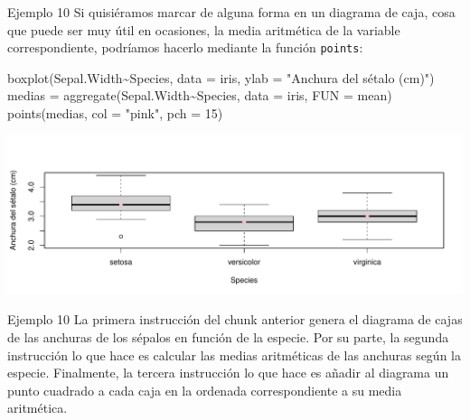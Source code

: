 \documentclass[
  ignorenonframetext,
  aspectratio=169]{beamer}
\newenvironment{Shaded}{\begin{snugshade}}{\end{snugshade}}
\newcommand{\AttributeTok}[1]{\textcolor[rgb]{0.77,0.63,0.00}{#1}}
\newcommand{\DecValTok}[1]{\textcolor[rgb]{0.00,0.00,0.81}{#1}}
\newcommand{\FunctionTok}[1]{\textcolor[rgb]{0.00,0.00,0.00}{#1}}
\newcommand{\NormalTok}[1]{#1}
\newcommand{\OtherTok}[1]{\textcolor[rgb]{0.56,0.35,0.01}{#1}}
\newcommand{\SpecialCharTok}[1]{\textcolor[rgb]{0.00,0.00,0.00}{#1}}
\newcommand{\StringTok}[1]{\textcolor[rgb]{0.31,0.60,0.02}{#1}}
\begin{document}
\begin{frame}[fragile]{Ejemplo 10}
\protect\hypertarget{ejemplo-10-1}{}
Si quisiéramos marcar de alguna forma en un diagrama de caja, cosa que
puede ser muy útil en ocasiones, la media aritmética de la variable
correspondiente, podríamos hacerlo mediante la función \texttt{points}:

\begin{Shaded}
\begin{Highlighting}[]
\FunctionTok{boxplot}\NormalTok{(Sepal.Width}\SpecialCharTok{\textasciitilde{}}\NormalTok{Species, }\AttributeTok{data =}\NormalTok{ iris, }\AttributeTok{ylab =} \StringTok{"Anchura del sétalo (cm)"}\NormalTok{)}
\NormalTok{medias }\OtherTok{=} \FunctionTok{aggregate}\NormalTok{(Sepal.Width}\SpecialCharTok{\textasciitilde{}}\NormalTok{Species, }\AttributeTok{data =}\NormalTok{ iris, }\AttributeTok{FUN =}\NormalTok{ mean)}
\FunctionTok{points}\NormalTok{(medias, }\AttributeTok{col =} \StringTok{"pink"}\NormalTok{, }\AttributeTok{pch =} \DecValTok{15}\NormalTok{)}
\end{Highlighting}
\end{Shaded}

\includegraphics[width=0.8\linewidth]{Hora5_files/figure-beamer/unnamed-chunk-16-1}
\end{frame}

\begin{frame}{Ejemplo 10}
\protect\hypertarget{ejemplo-10-2}{}
La primera instrucción del chunk anterior genera el diagrama de cajas de
las anchuras de los sépalos en función de la especie. Por su parte, la
segunda instrucción lo que hace es calcular las medias aritméticas de
las anchuras según la especie. Finalmente, la tercera instrucción lo que
hace es añadir al diagrama un punto cuadrado a cada caja en la ordenada
correspondiente a su media aritmética.
\end{frame}
\end{document}
